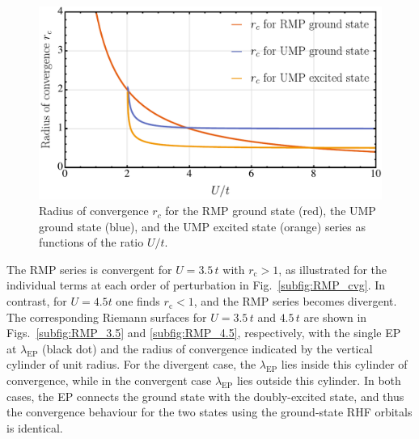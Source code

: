 \documentclass[aps,prb,reprint,noshowkeys,superscriptaddress]{revtex4-1}
\newcommand{\rc}{r_{\text{c}}}
\newcommand{\lep}{\lambda_{\text{EP}}}
\begin{document}
\begin{figure}[htb]
	\includegraphics[width=\linewidth]{RadConv}
	\caption{
	Radius of convergence $r_c$ for the RMP ground state (red), the UMP ground state (blue), and the UMP excited state (orange) 
    series as functions of the ratio $U/t$.
	\label{fig:RadConv}}
\end{figure}

The RMP series is convergent for $U = 3.5\,t$ with $\rc > 1$, as illustrated for the individual terms at each order
of perturbation in Fig.~\ref{subfig:RMP_cvg}.
In contrast, for $U = 4.5t$ one finds $\rc < 1$, and the RMP series becomes divergent.
The corresponding Riemann surfaces for $U = 3.5\,t$ and $4.5\,t$ are shown in Figs.~\ref{subfig:RMP_3.5} and 
\ref{subfig:RMP_4.5}, respectively, with the single EP at $\lep$ (black dot) and the radius of convergence indicated
by the vertical cylinder of unit radius.
For the divergent case, the $\lep$ lies inside this cylinder of convergence, while in the convergent case $\lep$ lies
outside this cylinder.
In both cases, the EP connects the ground state with the doubly-excited state, and thus the convergence behaviour
for the two states using the ground-state RHF orbitals is identical.
\end{document}
